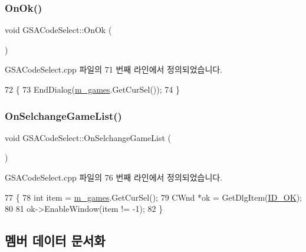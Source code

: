 \subsubsection{\texorpdfstring{On\+Ok()}{OnOk()}}
{\footnotesize\ttfamily void G\+S\+A\+Code\+Select\+::\+On\+Ok (\begin{DoxyParamCaption}{ }\end{DoxyParamCaption})\hspace{0.3cm}{\ttfamily [protected]}}



G\+S\+A\+Code\+Select.\+cpp 파일의 71 번째 라인에서 정의되었습니다.


\begin{DoxyCode}
72 \{
73   EndDialog(\mbox{\hyperlink{class_g_s_a_code_select_a732e7dca958e45d23a1d00234c23c838}{m\_games}}.GetCurSel());
74 \}
\end{DoxyCode}
\mbox{\label{class_g_s_a_code_select_a14529b62932e8eed3bc92f1a4d902b48}} 
\subsubsection{\texorpdfstring{On\+Selchange\+Game\+List()}{OnSelchangeGameList()}}
{\footnotesize\ttfamily void G\+S\+A\+Code\+Select\+::\+On\+Selchange\+Game\+List (\begin{DoxyParamCaption}{ }\end{DoxyParamCaption})\hspace{0.3cm}{\ttfamily [protected]}}



G\+S\+A\+Code\+Select.\+cpp 파일의 76 번째 라인에서 정의되었습니다.


\begin{DoxyCode}
77 \{
78   \textcolor{keywordtype}{int} item = \mbox{\hyperlink{class_g_s_a_code_select_a732e7dca958e45d23a1d00234c23c838}{m\_games}}.GetCurSel();
79   CWnd *ok = GetDlgItem(\mbox{\hyperlink{resource_8h_a4cf7b8af561e85b223c39c4c2b22ef18}{ID\_OK}});
80 
81   ok->EnableWindow(item != -1);
82 \}
\end{DoxyCode}


\subsection{멤버 데이터 문서화}
\mbox{\label{class_g_s_a_code_select_a96b171e4976a250bdcac447654cdef12}} 
